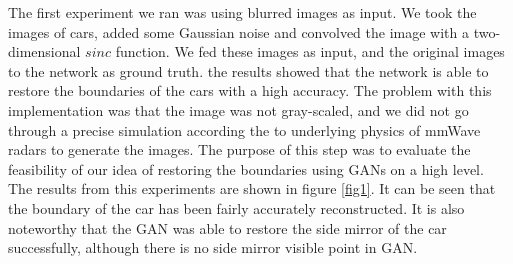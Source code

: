 The first experiment we ran was using blurred images as input. We took the images of cars, added some Gaussian noise and convolved the image with a two-dimensional $sinc$ function. We fed these images as input, and the original images to the network as ground truth. the results showed that the network is able to restore the boundaries of the cars with a high accuracy. The problem with this implementation was that the image was not gray-scaled, and we did not go through a precise simulation according the to underlying physics of mmWave radars to generate the images. The purpose of this step was to evaluate the feasibility of our idea of restoring the boundaries using GANs on a high level. The results from this experiments are shown in figure \ref{fig1}. It can be seen that the boundary of the car has been fairly accurately reconstructed. It is also noteworthy that the GAN was able to restore the side mirror of the car successfully, although there is no side mirror visible point in GAN. 

